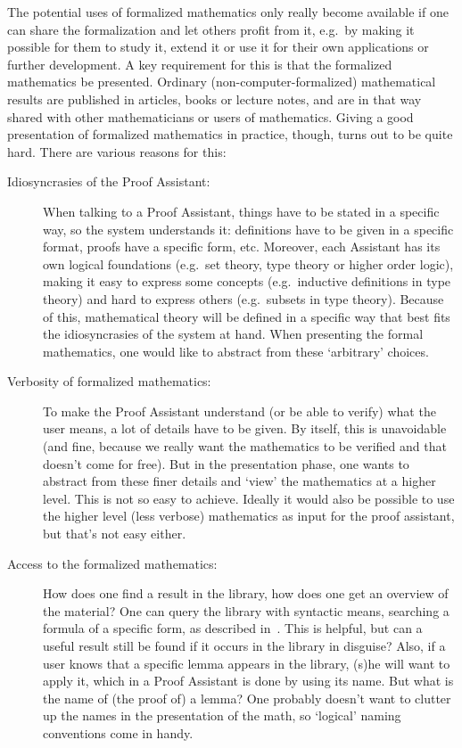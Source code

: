 \documentclass[runningheads]{llncs}
\begin{document}
The potential uses of formalized mathematics only really become
available if one can share the formalization and let others profit
from it, e.g.\ by making it possible for them to study it, extend it
or use it for their own applications or further development. A key
requirement for this is that the formalized mathematics be presented.
Ordinary (non-computer-formalized) mathematical results are published
in articles, books or lecture notes, and are in that way shared with
other mathematicians or users of mathematics.  Giving a good
presentation of formalized mathematics in practice, though, turns out
to be quite hard. There are various reasons for this:
\begin{description}
\item[Idiosyncrasies of the Proof Assistant:]
When talking to a Proof Assistant, things have to be stated in a
specific way, so the system understands it: definitions have to be
given in a specific format, proofs have a specific form, etc. Moreover,
each Assistant has its own logical foundations (e.g.\ set theory, type theory
or higher order logic), making it easy to express some concepts
(e.g.\ inductive definitions in type theory) and hard to express
others (e.g.\ subsets in type theory). Because of this, mathematical
theory will be defined in a specific way that best fits the
idiosyncrasies of the system at hand. When presenting the formal
mathematics, one would like to abstract from these `arbitrary'
choices.
\item[Verbosity of formalized mathematics:]
To make the Proof Assistant understand (or be able to verify) what the
user means, a lot of details have to be given. By itself, this is
unavoidable (and fine, because we really want the mathematics to be
verified and that doesn't come for free). But in the presentation
phase, one wants to abstract from these finer details and `view' the
mathematics at a higher level. This is not so easy to achieve. Ideally
it would also be possible to use the higher level (less verbose)
mathematics as input for the proof assistant, but that's not easy
either.
\item[Access to the formalized mathematics:]
How does one find a result in the library, how does one get an
overview of the material? One can query the library with syntactic
means, searching a formula of a specific form, as described 
in~\cite{guidi2003}.
This is helpful, but can a useful result still be found if it
occurs in the library in disguise?
Also, if a user knows that a
specific lemma appears in the library, (s)he will want to apply it,
which in a Proof Assistant is done by using its name. But what is the
name of (the proof of) a lemma? One probably doesn't want to clutter
up the names in the presentation of the math, so `logical' naming
conventions come in handy.
\end{description}
\end{document}
